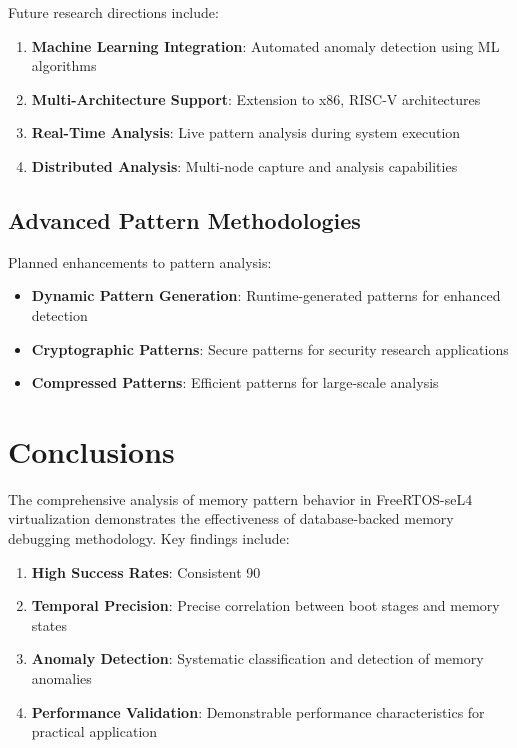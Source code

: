 \documentclass[11pt,a4paper]{article}
\begin{document}
Future research directions include:

\begin{enumerate}
    \item \textbf{Machine Learning Integration}: Automated anomaly detection using ML algorithms
    \item \textbf{Multi-Architecture Support}: Extension to x86, RISC-V architectures
    \item \textbf{Real-Time Analysis}: Live pattern analysis during system execution
    \item \textbf{Distributed Analysis}: Multi-node capture and analysis capabilities
\end{enumerate}

\subsection{Advanced Pattern Methodologies}

Planned enhancements to pattern analysis:

\begin{itemize}
    \item \textbf{Dynamic Pattern Generation}: Runtime-generated patterns for enhanced detection
    \item \textbf{Cryptographic Patterns}: Secure patterns for security research applications
    \item \textbf{Compressed Patterns}: Efficient patterns for large-scale analysis
\end{itemize}

\section{Conclusions}

The comprehensive analysis of memory pattern behavior in FreeRTOS-seL4 virtualization demonstrates the effectiveness of database-backed memory debugging methodology. Key findings include:

\begin{enumerate}
    \item \textbf{High Success Rates}: Consistent 90%
    \item \textbf{Temporal Precision}: Precise correlation between boot stages and memory states
    \item \textbf{Anomaly Detection}: Systematic classification and detection of memory anomalies
    \item \textbf{Performance Validation}: Demonstrable performance characteristics for practical application
\end{enumerate}
\end{document}
